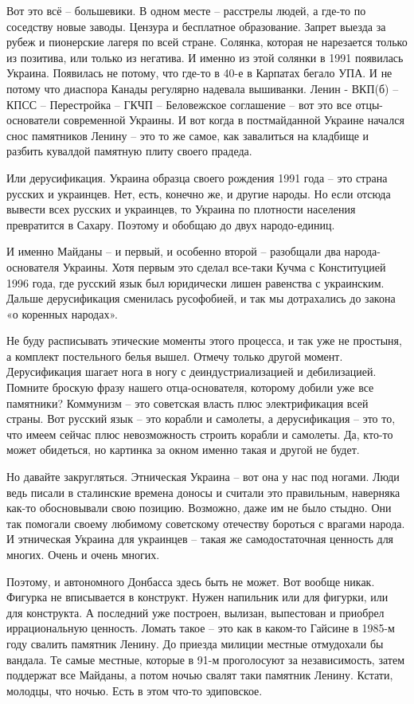 Вот это всё – большевики. В одном месте – расстрелы людей, а где-то по
соседству новые заводы. Цензура и бесплатное образование. Запрет выезда за
рубеж и пионерские лагеря по всей стране. Солянка, которая не нарезается только
из позитива, или только из негатива. И именно из этой солянки в 1991 появилась
Украина. Появилась не потому, что где-то в 40-е в Карпатах бегало УПА. И не
потому что диаспора Канады регулярно надевала вышиванки. Ленин - ВКП(б) – КПСС
– Перестройка – ГКЧП – Беловежское соглашение – вот это все отцы-основатели
современной Украины. И вот когда в постмайданной Украине начался снос
памятников Ленину – это то же самое, как завалиться на кладбище и разбить
кувалдой памятную плиту своего прадеда.

Или дерусификация. Украина образца своего рождения 1991 года – это страна
русских и украинцев. Нет, есть, конечно же, и другие народы. Но если отсюда
вывести всех русских и украинцев, то Украина по плотности населения превратится
в Сахару. Поэтому и обобщаю до двух народо-единиц.

И именно Майданы – и первый, и особенно второй – разобщали два
народа-основателя Украины. Хотя первым это сделал все-таки Кучма с Конституцией
1996 года, где русский язык был юридически лишен равенства с украинским. Дальше
дерусификация сменилась русофобией, и так мы дотрахались до закона «о коренных
народах».

Не буду расписывать этические моменты этого процесса, и так уже не простыня, а
комплект постельного белья вышел. Отмечу только другой момент. Дерусификация
шагает нога в ногу с деиндустриализацией и дебилизацией. Помните броскую фразу
нашего отца-основателя, которому добили уже все памятники? Коммунизм – это
советская власть плюс электрификация всей страны. Вот русский язык – это
корабли и самолеты, а дерусификация – это то, что имеем сейчас плюс
невозможность строить корабли и самолеты. Да, кто-то может обидеться, но
картинка за окном именно такая и другой не будет.

Но давайте закругляться. Этническая Украина – вот она у нас под ногами. Люди
ведь писали в сталинские времена доносы и считали это правильным, наверняка
как-то обосновывали свою позицию. Возможно, даже им не было стыдно. Они так
помогали своему любимому советскому отечеству бороться с врагами народа. И
этническая Украина для украинцев – такая же самодостаточная ценность для
многих. Очень и очень многих.

Поэтому, и автономного Донбасса здесь быть не может. Вот вообще никак. Фигурка
не вписывается в конструкт. Нужен напильник или для фигурки, или для
конструкта. А последний уже построен, вылизан, выпестован и приобрел
иррациональную ценность. Ломать такое – это как в каком-то Гайсине в 1985-м
году свалить памятник Ленину. До приезда милиции местные отмудохали бы вандала.
Те самые местные, которые в 91-м проголосуют за независимость, затем поддержат
все Майданы, а потом ночью свалят таки памятник Ленину. Кстати, молодцы, что
ночью. Есть в этом что-то эдиповское.

